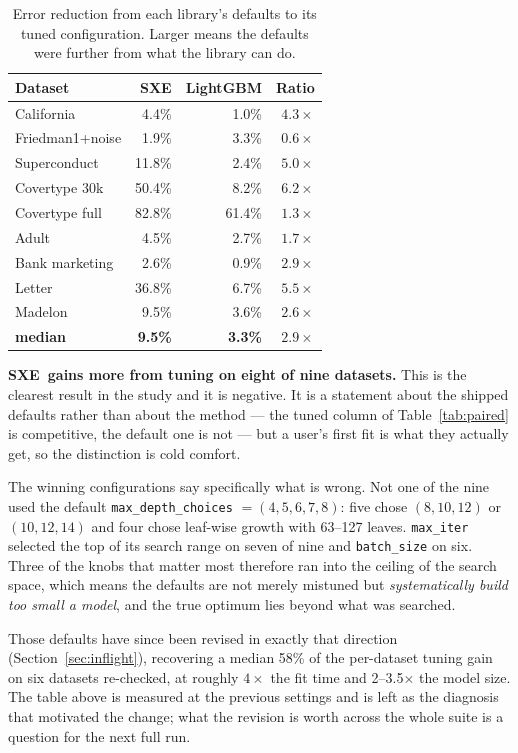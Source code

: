 \documentclass[11pt,a4paper]{article}
\newcommand{\code}[1]{\texttt{\small #1}}
\newcommand{\SXE}{\textsc{SXE}}
\theoremstyle{definition}
\begin{document}
\begin{table}[h]
\centering
\small
\caption{Error reduction from each library's defaults to its tuned
configuration. Larger means the defaults were further from what the library can
do.}
\label{tab:tuning}
\begin{tabular}{lrrr}
\toprule
Dataset & \SXE & LightGBM & Ratio \\
\midrule
California      & 4.4\%  & 1.0\%  & $4.3\times$ \\
Friedman1+noise & 1.9\%  & 3.3\%  & $0.6\times$ \\
Superconduct    & 11.8\% & 2.4\%  & $5.0\times$ \\
Covertype 30k   & 50.4\% & 8.2\%  & $6.2\times$ \\
Covertype full  & 82.8\% & 61.4\% & $1.3\times$ \\
Adult           & 4.5\%  & 2.7\%  & $1.7\times$ \\
Bank marketing  & 2.6\%  & 0.9\%  & $2.9\times$ \\
Letter          & 36.8\% & 6.7\%  & $5.5\times$ \\
Madelon         & 9.5\%  & 3.6\%  & $2.6\times$ \\
\midrule
\textbf{median} & \textbf{9.5\%} & \textbf{3.3\%} & $\mathbf{2.9\times}$ \\
\bottomrule
\end{tabular}
\end{table}

\textbf{\SXE\ gains more from tuning on eight of nine datasets.} This is the
clearest result in the study and it is negative. It is a statement about the
shipped defaults rather than about the method --- the tuned column of
Table~\ref{tab:paired} is competitive, the default one is not --- but a user's
first fit is what they actually get, so the distinction is cold comfort.

The winning configurations say specifically what is wrong. Not one of the nine
used the default \code{max\_depth\_choices} $=(4,5,6,7,8)$: five chose
$(8,10,12)$ or $(10,12,14)$ and four chose leaf-wise growth with 63--127
leaves. \code{max\_iter} selected the top of its search range on seven of nine
and \code{batch\_size} on six. Three of the knobs that matter most therefore
ran into the ceiling of the search space, which means the defaults are not
merely mistuned but \emph{systematically build too small a model}, and the true
optimum lies beyond what was searched.

Those defaults have since been revised in exactly that direction
(Section~\ref{sec:inflight}), recovering a median 58\% of the per-dataset
tuning gain on six datasets re-checked, at roughly $4\times$ the fit time and
2--3.5$\times$ the model size. The table above is measured at the previous
settings and is left as the diagnosis that motivated the change; what the
revision is worth across the whole suite is a question for the next full run.
\end{document}
